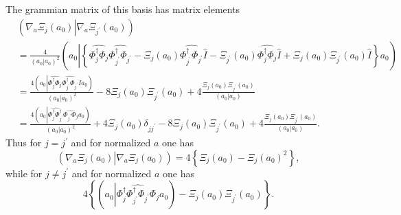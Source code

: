 \documentclass[aps,preprint]{revtex4}%
\begin{document}
The grammian matrix of this basis has matrix elements
\begin{align}
&  \left(  \nabla_{a}\Xi_{j}\left(  a_{0}\right)  \left\vert \nabla_{a}%
\Xi_{j^{\prime}}\left(  a_{0}\right)  \right.  \right) \nonumber\\
&  =\frac{4}{\left(  a_{0}\left\vert a_{0}\right.  \right)  ^{2}}\left(
a_{0}\left\vert \left\{  \widehat{\Phi_{j}^{\dagger}\Phi_{j}}\widehat
{\Phi_{j^{\prime}}^{\dagger}\Phi_{j^{\prime}}}-\Xi_{j}\left(  a_{0}\right)
\widehat{\Phi_{j^{\prime}}^{\dagger}\Phi_{j^{\prime}}}\widehat{I}%
-\Xi_{j^{\prime}}\left(  a_{0}\right)  \widehat{\Phi_{j}^{\dagger}\Phi_{j}%
}\widehat{I}+\Xi_{j}\left(  a_{0}\right)  \Xi_{j^{\prime}}\left(
a_{0}\right)  \widehat{I}\right\}  \right.  a_{0}\right) \nonumber\\
&  =\frac{4\left(  a_{0}\left\vert \widehat{\Phi_{j}^{\dagger}\Phi_{j}%
}\widehat{\Phi_{j^{\prime}}^{\dagger}\Phi_{j^{\prime}}}I\right.  a_{0}\right)
}{\left(  a_{0}\left\vert a_{0}\right.  \right)  ^{2}}-8\Xi_{j}\left(
a_{0}\right)  \Xi_{j^{\prime}}\left(  a_{0}\right)  +4\frac{\Xi_{j}\left(
a_{0}\right)  \Xi_{j^{\prime}}\left(  a_{0}\right)  }{\left(  a_{0}\left\vert
a_{0}\right.  \right)  }\nonumber\\
&  =\frac{4\left(  a_{0}\left\vert \widehat{\Phi_{j}^{\dagger}\Phi_{j^{\prime
}}^{\dagger}}\widehat{\Phi_{j^{\prime}}\Phi_{j}}\right.  a_{0}\right)
}{\left(  a_{0}\left\vert a_{0}\right.  \right)  ^{2}}+4\Xi_{j}\left(
a_{0}\right)  \delta_{jj^{\prime}}-8\Xi_{j}\left(  a_{0}\right)
\Xi_{j^{\prime}}\left(  a_{0}\right)  +4\frac{\Xi_{j}\left(  a_{0}\right)
\Xi_{j^{\prime}}\left(  a_{0}\right)  }{\left(  a_{0}\left\vert a_{0}\right.
\right)  }.
\end{align}
Thus for $j=j^{\prime}$ and for normalized $a$ one has
\begin{equation}
\left(  \nabla_{a}\Xi_{j}\left(  a_{0}\right)  \left\vert \nabla_{a}\Xi
_{j}\left(  a_{0}\right)  \right.  \right)  =4\left\{  \Xi_{j}\left(
a_{0}\right)  -\Xi_{j}\left(  a_{0}\right)  ^{2}\right\}  ,
\end{equation}
while for $j\neq j^{\prime}$ and for normalized $a$ one has%
\begin{equation}
4\left\{  \left(  a_{0}\left\vert \widehat{\Phi_{j}^{\dagger}\Phi_{j^{\prime}%
}^{\dagger}\Phi_{j^{\prime}}\Phi_{j}}\right.  a_{0}\right)  -\Xi_{j}\left(
a_{0}\right)  \Xi_{j^{\prime}}\left(  a_{0}\right)  \right\}  .
\end{equation}
\end{document}
